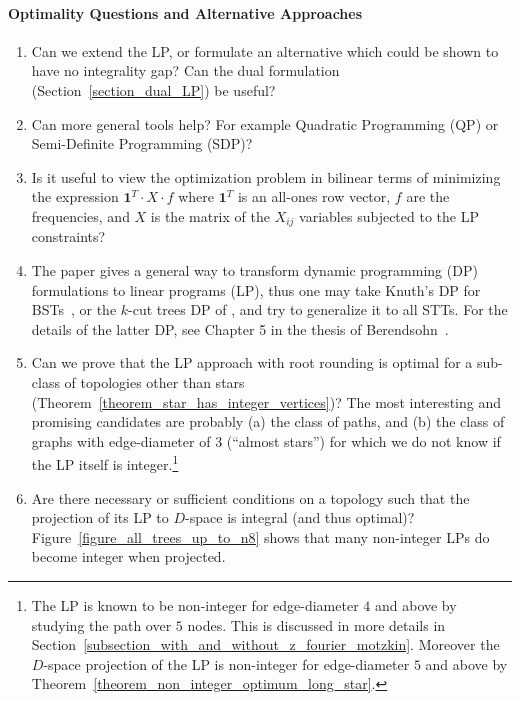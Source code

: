 \paragraph{Optimality Questions and Alternative Approaches}
\begin{enumerate}
    \item Can we extend the LP, or formulate an alternative which could be shown to have no integrality gap? Can the dual formulation (Section~\ref{section_dual_LP}) be useful?
    
    \item Can more general tools help? For example Quadratic Programming (QP) or Semi-Definite Programming (SDP)?

    \item Is it useful to view the optimization problem in bilinear terms of minimizing the expression $\mathbf{1}^T \cdot X \cdot f$ where $\mathbf{1}^T$ is an all-ones row vector, $f$ are the frequencies, and $X$ is the matrix of the $X_{ij}$ variables subjected to the LP constraints?

    \item The paper \cite{DPtoLP2010} gives a general way to transform dynamic programming (DP) formulations to linear programs (LP), thus one may take Knuth's DP  for BSTs~\cite{KnuthOptStatic1971}, or the $k$-cut trees DP of \cite{SplayTreesonTrees_andPTAS}, and try to generalize it to all STTs. For the details of the latter DP, see Chapter 5 in the thesis of Berendsohn~\cite{BerendsohnThesis}.

    \item \label{item_subclass} Can we prove that the LP approach with root rounding is optimal for a sub-class of topologies other than stars (Theorem~\ref{theorem_star_has_integer_vertices})? The most interesting and promising candidates are probably (a) the class of paths, and (b) the class of graphs with edge-diameter of $3$ (``almost stars'') for which we do not know if the LP itself is integer.\footnote{The LP is known to be non-integer for edge-diameter $4$ and above by studying the path over $5$ nodes. This is discussed in more details in Section~\ref{subsection_with_and_without_z_fourier_motzkin}. Moreover the $D$-space projection of the LP is non-integer for edge-diameter $5$ and above by Theorem~\ref{theorem_non_integer_optimum_long_star}.}
    
    \item Are there necessary or sufficient conditions on a topology such that the projection of its LP to $D$-space is integral (and thus optimal)? Figure~\ref{figure_all_trees_up_to_n8} shows that many non-integer LPs do become integer when projected.
\end{enumerate}



